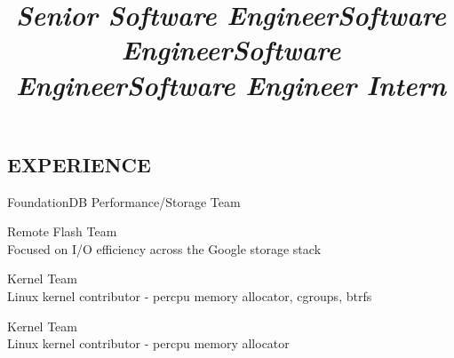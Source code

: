 \documentclass[margin,11pt]{res}
\begin{document}


\address{US Citizen}
\address{dennis@kernel.org $\bullet$ 651-442-8757}


\begin{resume}

\section{EXPERIENCE}
\title{\sl{Senior Software Engineer}}
\begin{position}
FoundationDB Performance/Storage Team
\end{position}

\title{\sl{Software Engineer}}
\begin{position}
Remote Flash Team\\
Focused on I/O efficiency across the Google storage stack
\end{position}

\title{\sl{Software Engineer}}
\begin{position}
Kernel Team\\
Linux kernel contributor - percpu memory allocator, cgroups, btrfs
\end{position}

\vspace{-24pt}
\employer{}
\location{}
\title{\sl{Software Engineer Intern}}
\begin{position}
Kernel Team\\
Linux kernel contributor - percpu memory allocator
\end{position}


\end{resume}
\end{document}
